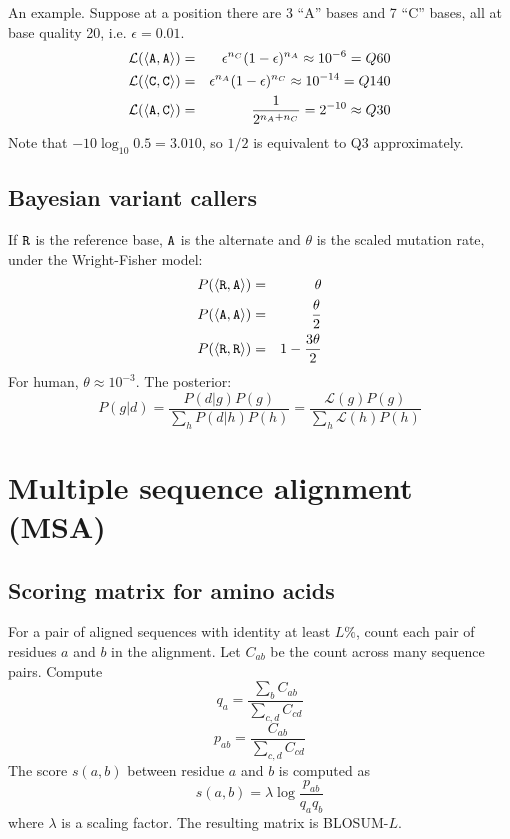 \documentclass[10pt]{article}
\begin{document}
An example. Suppose at a position there are 3 ``A'' bases and 7 ``C'' bases,
all at base quality 20, i.e. $\epsilon=0.01$.
\begin{eqnarray*}
\mathcal{L}(\langle{\tt A},{\tt A}\rangle)&=&\epsilon^{n_C}(1-\epsilon)^{n_A}\approx10^{-6}=Q60\\
\mathcal{L}(\langle{\tt C},{\tt C}\rangle)&=&\epsilon^{n_A}(1-\epsilon)^{n_C}\approx10^{-14}=Q140\\
\mathcal{L}(\langle{\tt A},{\tt C}\rangle)&=&\frac{1}{2^{n_A+n_C}}=2^{-10}\approx Q30
\end{eqnarray*}
Note that $-10\log_{10}0.5=3.010$, so $1/2$ is equivalent to Q3 approximately.

\subsection{Bayesian variant callers}
If ${\tt R}$ is the reference base, ${\tt A}$ is the alternate and $\theta$ is
the scaled mutation rate, under the Wright-Fisher model:
\begin{eqnarray*}
P(\langle{\tt R},{\tt A}\rangle)&=&\theta\\
P(\langle{\tt A},{\tt A}\rangle)&=&\frac{\theta}{2}\\
P(\langle{\tt R},{\tt R}\rangle)&=&1-\frac{3\theta}{2}\\
\end{eqnarray*}
For human, $\theta\approx10^{-3}$. The posterior:
$$
P(g|d)=\frac{P(d|g)P(g)}{\sum_hP(d|h)P(h)}=\frac{\mathcal{L}(g)P(g)}{\sum_h\mathcal{L}(h)P(h)}
$$

\newpage

\section{Multiple sequence alignment (MSA)}

\subsection{Scoring matrix for amino acids}

For a pair of aligned sequences with identity at least $L\%$, count each pair of
residues $a$ and $b$ in the alignment. Let $C_{ab}$ be the count across many
sequence pairs. Compute
$$
q_a=\frac{\sum_b C_{ab}}{\sum_{c,d}C_{cd}}
$$
$$
p_{ab}=\frac{C_{ab}}{\sum_{c,d}C_{cd}}
$$
The score $s(a,b)$ between residue $a$ and $b$ is computed as
$$
s(a,b)=\lambda\log\frac{p_{ab}}{q_aq_b}
$$
where $\lambda$ is a scaling factor. The resulting matrix is BLOSUM-$L$.
\end{document}
